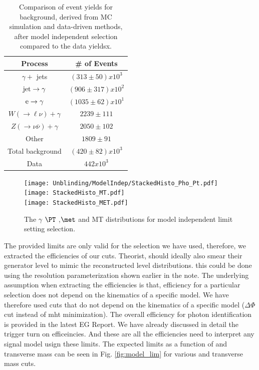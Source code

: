 \begin{table}[!hp]                                                                  
\center    
{          
\begin{tabular}{|c|c|}                                                             
\hline     
Process & \# of Events \\                                                              
\hline     
$\gamma +$ jets                          & $(313 \pm 50 ) x 10^3$ \\
${\rm jet}\rightarrow \gamma$        & $(906 \pm 317 ) x 10^2$ \\
${\rm e} \rightarrow \gamma$         & $(1035 \pm 62 ) x 10^1$ \\
$W(\to \ell\nu)+\gamma $                 &  $2239 \pm 111$ \\
$Z( \to \nu \bar{\nu} )+\gamma    $      & $ 2050 \pm 102$ \\
Other                                    &  $1809 \pm 91$ \\
\hline
Total background                       &   $(420 \pm 82 ) x 10^3$ \\
\hline
Data                                   &  $442 x 10^3$   \\
\hline     
\end{tabular}  
\caption{Comparison of event yields for background, derived from MC simulation and data-driven methods, after model independent selection compared to the data yieldsx.}
\label{table:model}                                                                
}          
\end{table}

\begin{figure}[!hp]
\centering
{\texttt{[image: Unblinding/ModelIndep/StackedHisto\_Pho\_Pt.pdf]}}
{\texttt{[image: StackedHisto\_MT.pdf]}}\\
{\texttt{[image: StackedHisto\_MET.pdf]}}
\caption{The $\gamma$ $\PT$ ,$\met$ and MT distributions for model independent limit setting selection.}
\label{fig:model}
\end{figure}

The provided limits are only valid for the selection we have used, therefore, we extracted the efficiencies of our cuts. Theorist, should ideally also smear their generator level \met to mimic the reconstructed level \met distributions. this could be done using the resolution parameterization shown earlier in the note. The underlying assumption when extracting the efficiencies is that, efficiency for a particular selection does not depend on the kinematics of a specific model. We have therefore used cuts that do not depend on the kinematics of a specific model ($\Delta\Phi$ cut instead of mht minimization). The overall efficiency for photon identification is provided in the latest EG Report. We have already discussed in detail the trigger turn on efficeincies. And these are all the efficiencies need to interpret any signal model usign these limits. The expected limits as a function of \met and transverse mass can be seen in Fig. \ref{fig:model_lim} for various \met and transverse mass cuts.

